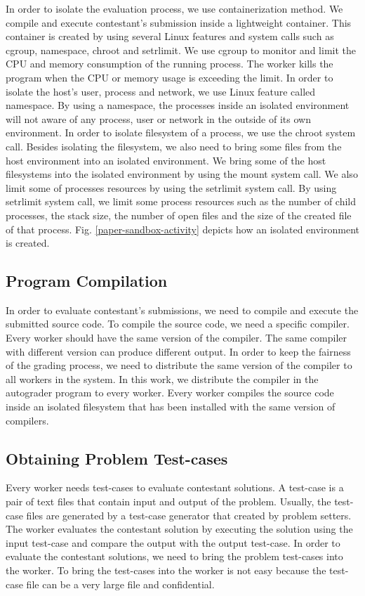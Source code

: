 \documentclass[conference]{IEEEtran}
\begin{document}
In order to isolate the evaluation process, we use containerization method. We compile and execute contestant's submission inside a lightweight container. This container is created by using several Linux features and system calls such as cgroup, namespace, chroot and setrlimit. We use cgroup to monitor and limit the CPU and memory consumption of the running process. The worker kills the program when the CPU or memory usage is exceeding the limit. In order to isolate the host's user, process and network, we use Linux feature called namespace. By using a namespace, the processes inside an isolated environment will not aware of any process, user or network in the outside of its own environment. In order to isolate filesystem of a process, we use the chroot system call. Besides isolating the filesystem, we also need to bring some files from the host environment into an isolated environment. We bring some of the host filesystems into the isolated environment by using the mount system call. We also limit some of processes resources by using the setrlimit system call. By using setrlimit system call, we limit some process resources such as the number of child processes, the stack size, the number of open files and the size of the created file of that process. Fig. \ref{paper-sandbox-activity} depicts how an isolated environment is created.

\subsection{Program Compilation}

In order to evaluate contestant's submissions, we need to compile and execute the submitted source code. To compile the source code, we need a specific compiler. Every worker should have the same version of the compiler. The same compiler with different version can produce different output. In order to keep the fairness of the grading process, we need to distribute the same version of the compiler to all workers in the system. In this work, we distribute the compiler in the autograder program to every worker. Every worker compiles the source code inside an isolated filesystem that has been installed with the same version of compilers.

\subsection{Obtaining Problem Test-cases}

Every worker needs test-cases to evaluate contestant solutions. A test-case is a pair of text files that contain input and output of the problem. Usually, the test-case files are generated by a test-case generator that created by problem setters. The worker evaluates the contestant solution by executing the solution using the input test-case and compare the output with the output test-case. In order to evaluate the contestant solutions, we need to bring the problem test-cases into the worker. To bring the test-cases into the worker is not easy because the test-case file can be a very large file and confidential.
\end{document}
